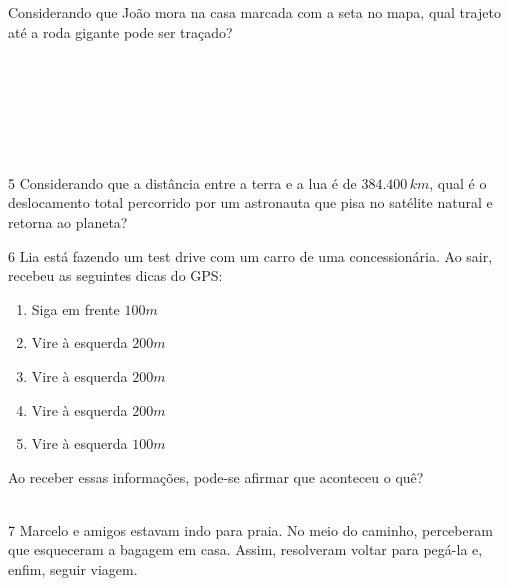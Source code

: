 {{%

Considerando que João mora na casa marcada com a seta no mapa, qual
trajeto até a roda gigante pode ser traçado?

\\
\\
\\
\\
\\
\\

\num{5} Considerando que a distância entre a terra e a lua é de $384.400\,km$,
qual é o deslocamento total percorrido por um astronauta que pisa no
satélite natural e retorna ao planeta?



\num{6} Lia está fazendo um test drive com um carro de uma concessionária. Ao
sair, recebeu as seguintes dicas do GPS:

\begin{enumerate}[itemsep=0pt]
\item Siga em frente  $100 m$
\item Vire à esquerda $200 m$
\item Vire à esquerda $200 m$
\item Vire à esquerda $200 m$
\item Vire à esquerda $100 m$
\end{enumerate}

Ao receber essas informações, pode-se afirmar que aconteceu o quê?

\\

\num{7} Marcelo e amigos estavam indo para praia. No meio do caminho,
perceberam que esqueceram a bagagem em casa. Assim, resolveram voltar
para pegá-la e, enfim, seguir viagem.

}}

